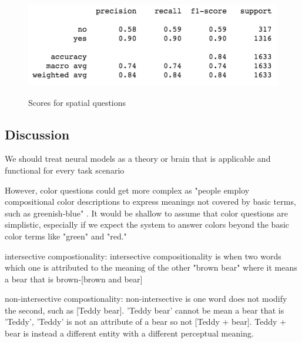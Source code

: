 \begin{figure}[H]
\includegraphics[scale=0.45]{latex/images/spatialscore.png}
\label{fig:HeatmapAfter}
\caption{Scores for spatial questions}
\end{figure}



\subsection{Discussion}

We should treat neural models as a theory or brain that is applicable and functional for every task scenario \cite{regier1996human}  



However, color questions could get more complex as "people employ compositional color descriptions to express meanings not covered by basic terms, such as greenish-blue" \cite{monroe2016learning}. It would be shallow to assume that color questions are simplistic, especially if we expect the system to answer colors beyond the basic color terms like "green" and "red." 

\cite{monroe2017colors}


intersective compostionality: intersective compositionality is when two words which one is attributed to the meaning of the other "brown bear" where it means a bear that is brown-[brown and bear] 

non-intersective compostionality: non-intersective is one word does not modify the second, such as [Teddy bear]. 'Teddy bear' cannot be mean a bear that is 'Teddy', 'Teddy' is not an attribute of a bear so not [Teddy + bear]. Teddy + bear is instead a different entity with a different perceptual meaning. 

\cite{larsson-2017-compositionality} 